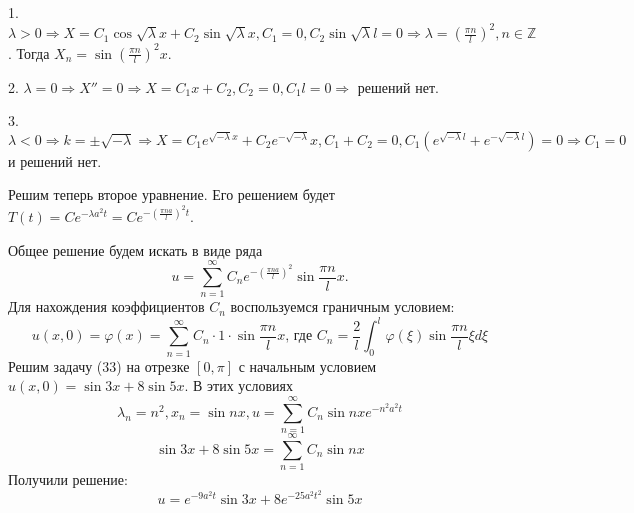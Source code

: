 \documentclass[11pt]{article}
\newcounter{th}\setcounter{th}{0}
\begin{document}
1. $\lambda > 0 \Rightarrow X = C_1\cos\sqrt{\lambda}x + C_2\sin\sqrt{\lambda}x, C_1 = 0, C_2\sin\sqrt{\lambda}l = 0 \Rightarrow \lambda = \left(\frac{\pi n}l\right)^2, n \in \mathbb{Z}$.
Тогда $X_n = \sin\left(\frac{\pi n}l\right)^2x$.

2. $\lambda = 0 \Rightarrow X'' = 0 \Rightarrow X = C_1x + C_2, C_2 = 0, C_1l = 0 \Rightarrow$ решений нет.

3. $\lambda < 0 \Rightarrow k = \pm \sqrt{-\lambda} \Rightarrow X = C_1e^{\sqrt{-\lambda}x} + C_2e^{-\sqrt{-\lambda}}x, C_1 + C_2 = 0, C_1(e^{\sqrt{-\lambda}l} + e^{-\sqrt{-\lambda}l}) = 0 \Rightarrow C_1 = 0$ и решений нет.

Решим теперь второе уравнение. Его решением будет $T(t) = Ce^{-\lambda a^2t} = Ce^{-\left(\frac{\pi n a}l\right)^2t}$.

Общее решение будем искать в виде ряда
$$u = \sum_{n = 1}^{\infty} C_ne^{-\left(\frac{\pi na}l\right)^2}\sin\frac{\pi n}lx.$$
Для нахождения коэффициентов $C_n$ воспользуемся граничным условием:
\begin{equation}
u(x, 0) = \varphi(x) = \sum_{n = 1}^{\infty}C_n\cdot1\cdot\sin\frac{\pi n}lx\text{, где } C_n = \frac2l\int_{0}^l\varphi(\xi)\sin\frac{\pi n}l\xi d\xi
\end{equation}
Решим задачу (33) на отрезке $[0, \pi]$ с начальным условием $u(x, 0) = \sin 3x + 8\sin 5x$.
В этих условиях
$$\lambda_n = n^2, x_n = \sin nx, u = \sum_{n = 1}^{\infty}C_n\sin nxe^{-n^2a^2t}$$
$$\sin 3x + 8\sin 5x = \sum_{n = 1}^{\infty}C_n\sin nx$$
Получили решение:
$$u = e^{-9a^2t}\sin3x + 8e^{-25a^2t^2}\sin 5x$$
\end{document}
